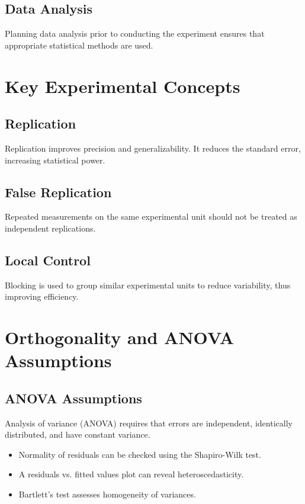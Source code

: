 \documentclass{tufte-handout}
\begin{document}
\subsection{Data Analysis}
Planning data analysis prior to conducting the experiment ensures that appropriate statistical methods are used.

\section{Key Experimental Concepts}

\subsection{Replication}
Replication improves precision and generalizability. It reduces the standard error, increasing statistical power.

\subsection{False Replication}
Repeated measurements on the same experimental unit should not be treated as independent replications.

\subsection{Local Control}
Blocking is used to group similar experimental units to reduce variability, thus improving efficiency.

\section{Orthogonality and ANOVA Assumptions}

\subsection{ANOVA Assumptions}
Analysis of variance (ANOVA) requires that errors are independent, identically distributed, and have constant variance.

\begin{itemize}
  \item Normality of residuals can be checked using the Shapiro-Wilk test.
  \item A residuals vs. fitted values plot can reveal heteroscedasticity.
  \item Bartlett’s test assesses homogeneity of variances.
\end{itemize}
\end{document}
